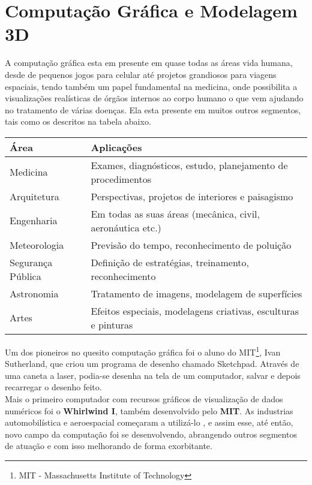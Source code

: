 \section{Computação Gráfica e Modelagem 3D}
A computação gráfica esta em presente em quase todas as áreas vida humana, desde de pequenos jogos para celular até projetos grandiosos para viagens espaciais, tendo também um papel fundamental na medicina, onde possibilita a visualizações realísticas de órgãos internos ao corpo humano o que vem ajudando no tratamento de várias doenças\cite{comp_grafica_h}\cite{azevedo}\cite{kirne}. Ela esta presente em muitos outros segmentos, tais como os descritos na tabela abaixo. \\

\begin{center}
\begin{tabular}{|l|l|}
    \hline
    Área & Aplicações \\ \hline
    Medicina &  Exames, diagnósticos, estudo, planejamento de procedimentos\\ \hline
    Arquitetura & Perspectivas, projetos de interiores e paisagismo\\ \hline
    Engenharia & Em todas as suas áreas (mecânica, civil, aeronáutica etc.)\\ \hline
    Meteorologia & Previsão do tempo, reconhecimento de poluição\\ \hline
    Segurança Pública & Definição de estratégias, treinamento, reconhecimento\\ \hline
    Astronomia & Tratamento de imagens, modelagem de superfícies\\ \hline
    Artes & Efeitos especiais, modelagens criativas, esculturas e pinturas\\
    \hline
\end{tabular}
\end{center}

Um dos pioneiros no quesito computação gráfica foi o aluno do MIT\footnote{MIT - Massachusetts Institute of Technology}, Ivan Sutherland, que criou um programa de desenho chamado Sketchpad\cite{sutherland}. Através de uma caneta a laser, podia-se desenha na tela de um computador, salvar e depois recarregar o desenho feito.\\

 Mais o primeiro computador com recursos gráficos de visualização de dados numéricos foi o \textbf{Whirlwind I}, também desenvolvido pelo \textbf{MIT}. As industrias automobilística e aeroespacial começaram a utilizá-lo , e assim esse, até então, novo campo da computação foi se desenvolvendo, abrangendo outros segmentos de atuação e com isso melhorando de forma exorbitante\cite{comp_grafica_h2}.  \\

